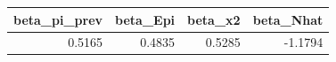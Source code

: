 \begin{tabular}{rrrr}
\toprule
beta_pi_prev & beta_Epi & beta_x2 & beta_Nhat \\
\midrule
0.5165 & 0.4835 & 0.5285 & -1.1794 \\
\bottomrule
\end{tabular}
